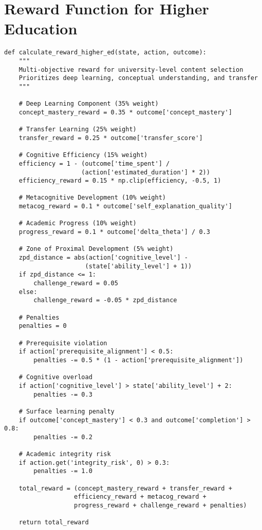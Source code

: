 \documentclass[11pt,a4paper]{report}
\begin{document}
\section{Reward Function for Higher Education}

\begin{lstlisting}[caption={Multi-objective Reward Function for University Learning},label={lst:reward}]
def calculate_reward_higher_ed(state, action, outcome):
    """
    Multi-objective reward for university-level content selection
    Prioritizes deep learning, conceptual understanding, and transfer
    """
    
    # Deep Learning Component (35% weight)
    concept_mastery_reward = 0.35 * outcome['concept_mastery']
    
    # Transfer Learning (25% weight)
    transfer_reward = 0.25 * outcome['transfer_score']
    
    # Cognitive Efficiency (15% weight)
    efficiency = 1 - (outcome['time_spent'] / 
                     (action['estimated_duration'] * 2))
    efficiency_reward = 0.15 * np.clip(efficiency, -0.5, 1)
    
    # Metacognitive Development (10% weight)
    metacog_reward = 0.1 * outcome['self_explanation_quality']
    
    # Academic Progress (10% weight)
    progress_reward = 0.1 * outcome['delta_theta'] / 0.3
    
    # Zone of Proximal Development (5% weight)
    zpd_distance = abs(action['cognitive_level'] - 
                      (state['ability_level'] + 1))
    if zpd_distance <= 1:
        challenge_reward = 0.05
    else:
        challenge_reward = -0.05 * zpd_distance
    
    # Penalties
    penalties = 0
    
    # Prerequisite violation
    if action['prerequisite_alignment'] < 0.5:
        penalties -= 0.5 * (1 - action['prerequisite_alignment'])
    
    # Cognitive overload
    if action['cognitive_level'] > state['ability_level'] + 2:
        penalties -= 0.3
    
    # Surface learning penalty
    if outcome['concept_mastery'] < 0.3 and outcome['completion'] > 0.8:
        penalties -= 0.2
    
    # Academic integrity risk
    if action.get('integrity_risk', 0) > 0.3:
        penalties -= 1.0
    
    total_reward = (concept_mastery_reward + transfer_reward + 
                   efficiency_reward + metacog_reward + 
                   progress_reward + challenge_reward + penalties)
    
    return total_reward
\end{lstlisting}
\end{document}
